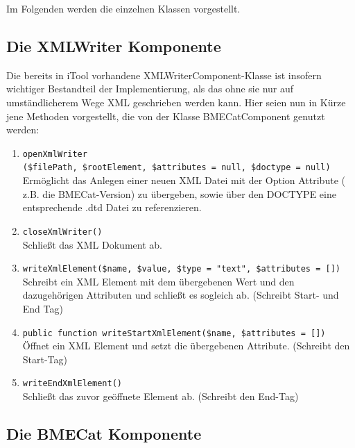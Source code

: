 	
	
	
	Im Folgenden werden die einzelnen Klassen vorgestellt.
	
	\subsection{Die XMLWriter Komponente}
	
	Die bereits in iTool vorhandene XMLWriterComponent-Klasse ist insofern wichtiger Bestandteil der Implementierung, als das ohne sie nur auf umständlicherem Wege XML geschrieben werden kann. Hier seien nun in Kürze jene Methoden vorgestellt, die von der Klasse BMECatComponent genutzt werden:
	
	\begin{enumerate}[noitemsep]
	\item \texttt{openXmlWriter\\(\$filePath, \$rootElement, \$attributes = null, \$doctype = null)} \\
		  Ermöglicht das Anlegen einer neuen XML Datei mit der Option Attribute ( z.B. die BMECat-Version) zu übergeben, sowie über den DOCTYPE eine entsprechende .dtd Datei zu referenzieren.
	\item \texttt{closeXmlWriter()} \\
		  Schließt das XML Dokument ab.
	\item \texttt{writeXmlElement(\$name, \$value, \$type = "text", \$attributes = [])}\\
		  Schreibt ein XML Element mit dem übergebenen Wert und den dazugehörigen Attributen und schließt es sogleich ab. (Schreibt Start- und End Tag)
	\item \texttt{public function writeStartXmlElement(\$name, \$attributes = [])}\\
		  Öffnet ein XML Element und setzt die übergebenen Attribute. (Schreibt den Start-Tag)
	\item \texttt{writeEndXmlElement()}\\
		  Schließt das zuvor geöffnete Element ab. (Schreibt den End-Tag)
	\end{enumerate}
	
	\subsection{Die BMECat Komponente}
	
